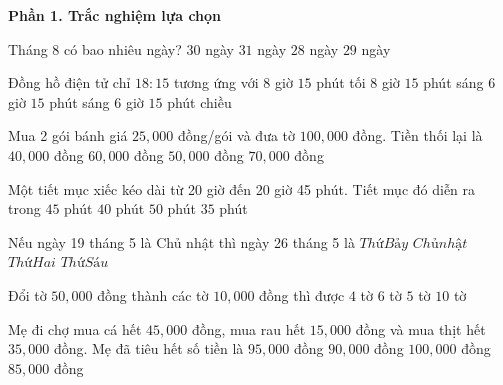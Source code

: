 \textbf{Phần 1. Trắc nghiệm lựa chọn}

\begin{ex} %
Tháng 8 có bao nhiêu ngày?
\choice
{$30$ ngày}
{\True $31$ ngày}
{$28$ ngày}
{$29$ ngày}
\end{ex}

\begin{ex} %
Đồng hồ điện tử chỉ $18:15$ tương ứng với
\choice
{$8$ giờ $15$ phút tối}
{$8$ giờ $15$ phút sáng}
{$6$ giờ $15$ phút sáng}
{\True $6$ giờ $15$ phút chiều}
\end{ex}

\begin{ex} %
Mua 2 gói bánh giá $25,000$ đồng/gói và đưa tờ $100,000$ đồng. Tiền thối lại là
\choice
{$40,000$ đồng}
{$60,000$ đồng}
{\True $50,000$ đồng}
{$70,000$ đồng}
\end{ex}

\begin{ex} %
Một tiết mục xiếc kéo dài từ 20 giờ đến 20 giờ 45 phút. Tiết mục đó diễn ra trong
\choice
{\True $45$ phút}
{$40$ phút}
{$50$ phút}
{$35$ phút}
\end{ex}

\begin{ex} %
Nếu ngày 19 tháng 5 là Chủ nhật thì ngày 26 tháng 5 là
\choice
{$Thứ Bảy$}
{\True $Chủ nhật$}
{$Thứ Hai$}
{$Thứ Sáu$}
\end{ex}

\begin{ex} %
Đổi tờ $50,000$ đồng thành các tờ $10,000$ đồng thì được
\choice
{$4$ tờ}
{$6$ tờ}
{\True $5$ tờ}
{$10$ tờ}
\end{ex}

\begin{ex} %
Mẹ đi chợ mua cá hết $45,000$ đồng, mua rau hết $15,000$ đồng và mua thịt hết $35,000$ đồng. Mẹ đã tiêu hết số tiền là
\choice
{\True $95,000$ đồng}
{$90,000$ đồng}
{$100,000$ đồng}
{$85,000$ đồng}
\end{ex}

